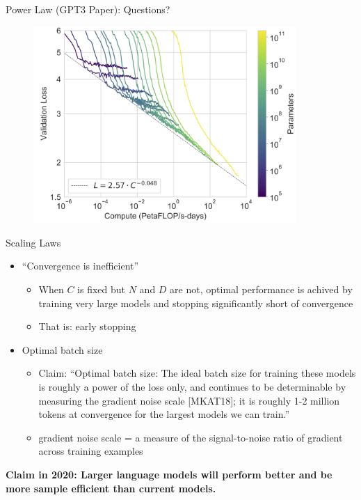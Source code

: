 \begin{vbframe}{Power Law (GPT3 Paper): Questions?}

\begin{figure}
    \centering
    \includegraphics[width=10cm]{figure/losscompute.png}
\end{figure}
    
\end{vbframe}


\begin{vbframe}{Scaling Laws}

\vfill

\begin{itemize}

	\item ``Convergence is inefficient''
	\begin{itemize}
	\item When $C$ is fixed but $N$ and $D$ are not, optimal performance is achived by training very large models and stopping significantly short of convergence  
        \item That is: early stopping
	\end{itemize}

	\item Optimal batch size
	\begin{itemize}
    	\item Claim: “Optimal batch size: The ideal batch size for training these
                models is roughly a power of the loss only, and continues to
                be determinable by measuring the gradient noise scale
                [MKAT18]; it is roughly 1-2 million tokens at convergence for
                the largest models we can train.”
    	\item gradient noise scale = a measure of the signal-to-noise ratio
            of gradient across training examples
	\end{itemize}

\end{itemize}

\vskip3mm

\textbf{Claim in 2020: Larger language models will perform better and be more sample efficient than current models.} 

\vfill

\end{vbframe}

